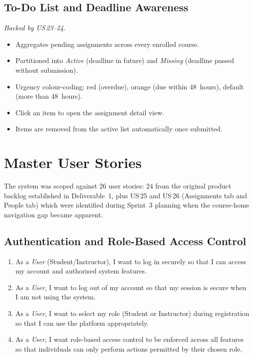 \documentclass[12pt, a4paper]{article}
\begin{document}
{\subsection{To-Do List and Deadline Awareness}
\textit{Backed by US\,23--24.}
\begin{itemize}
  \item Aggregates pending assignments across every enrolled course.
  \item Partitioned into \emph{Active} (deadline in future) and \emph{Missing} (deadline passed without submission).
  \item Urgency colour-coding: red (overdue), orange (due within 48~hours), default (more than 48~hours).
  \item Click an item to open the assignment detail view.
  \item Items are removed from the active list automatically once submitted.
\end{itemize}
\par}

\section{Master User Stories}
\label{sec:stories}

The system was scoped against 26 user stories: 24 from the original product
backlog established in Deliverable~1, plus US\,25 and US\,26 (Assignments tab
and People tab) which were identified during Sprint~3 planning when the
course-home navigation gap became apparent.

\subsection{Authentication and Role-Based Access Control}
\begin{enumerate}[label=\textbf{US\,\arabic*}]
  \item As a \emph{User} (Student/Instructor), I want to log in securely so
        that I can access my account and authorised system features.
  \item As a \emph{User}, I want to log out of my account so that my session
        is secure when I am not using the system.
  \item As a \emph{User}, I want to select my role (Student or Instructor)
        during registration so that I can use the platform appropriately.
  \item As a \emph{User}, I want role-based access control to be enforced
        across all features so that individuals can only perform actions
        permitted by their chosen role.
\end{enumerate}
\end{document}
